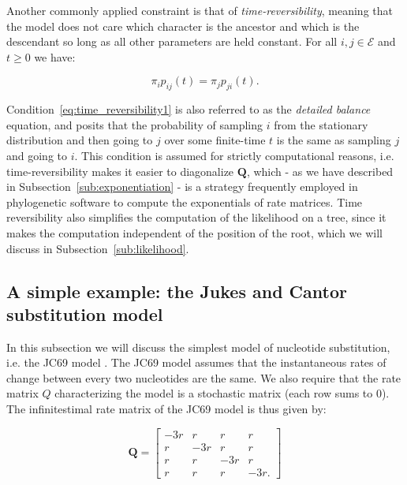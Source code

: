 Another commonly applied constraint is that of \emph{time-reversibility}, meaning that the model does not care which character is the ancestor and which is the descendant so long as all other parameters are held constant.
For all $i,j\in \mathcal{E}$ and $t\geq 0$ we have:

\begin{equation}
\pi_{i}p_{ij}(t)=\pi_{j}p_{ji}(t).
\label{eq:time_reversibility1}
\end{equation}

\noindent
Condition~\ref{eq:time_reversibility1} is also referred to as the \emph{detailed balance} equation, and posits that the probability of sampling $i$ from the stationary distribution and then going to $j$ over some finite-time $t$ is the same as sampling $j$ and going to $i$. 
% 
% 
This condition is assumed for strictly computational reasons, i.e. time-reversibility makes it easier to diagonalize $\mathbf{Q}$, which - as we have described in 
Subsection~\ref{sub:exponentiation} - is a strategy frequently employed in phylogenetic software to compute the exponentials of rate matrices.
Time reversibility also simplifies the computation of the likelihood on a tree, since it makes the computation independent of the position of the root, which we will discuss in Subsection~\ref{sub:likelihood}.

\subsection{A simple example: the Jukes and Cantor substitution model\label{sub:jc69}}

In this subsection we will discuss the simplest model of nucleotide substitution, i.e. the JC69 model \citep{Jukes1969}.
The JC69 model assumes that the instantaneous rates of change between every two nucleotides are the same.
We also require that the rate matrix $Q$ characterizing the model is a stochastic matrix (each row sums to 0).
The infinitestimal rate matrix of the JC69 model is thus given by:

\begin{equation}
\mathbf{Q}=\left[\begin{array}{cccc}
-3r & r & r & r\\
r & -3r & r & r\\
r & r & -3r & r\\
r & r & r & -3r.
\end{array}\right]
\label{eq:jc69}
\end{equation}

